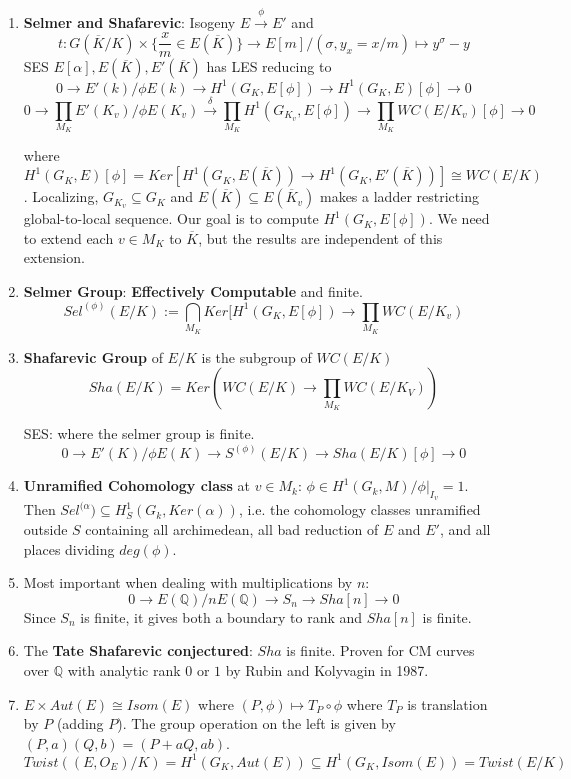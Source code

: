 \documentclass{article}
\newcommand{\Q}{\mathbb{Q}}
\newcommand{\ra}{\rightarrow}
\newcommand{\raa}[1]{\overset{#1}{\longrightarrow}}
\newcommand{\ACK}{\overline{K}}
\begin{document}
\begin{multicols}{2}
\begin{enumerate}
\item \textbf{Selmer and Shafarevic}: Isogeny $E \raa{\phi} E'$ and 
\[t: G(\ACK/K) \times \{\frac{x}{m} \in E(\ACK)\} \ra E[m]/(\sigma,y_x = x/m) \mapsto y^\sigma - y\]
SES $E[\alpha], E(\ACK), E'(\ACK)$ has LES reducing to 
\[0 \ra E'(k)/\phi E(k) \ra H^1(G_K, E[\phi]) \ra H^1(G_K,E)[\phi] \ra 0\]
\[0 \ra \prod_{M_K} E'(K_v)/\phi E(K_v) \raa{\delta} \prod_{M_K} H^1(G_{K_v}, E[\phi]) \ra \prod_{M_K} WC(E/K_v)[\phi] \ra 0\]

where $H^1(G_K,E)[\phi] = Ker[H^1(G_K,E(\ACK)) \ra H^1(G_K,E'(\ACK))] \cong WC(E/K)$. Localizing, $G_{K_v} \subseteq G_K$ and $E(\ACK) \subseteq E(\ACK_v)$ makes a ladder restricting global-to-local sequence. Our goal is to compute $H^1(G_K,E[\phi])$. We need to extend each $v \in M_K$ to $\ACK$, but the results are independent of this extension. 

\item \textbf{Selmer Group}: \textbf{Effectively Computable} and finite. \[Sel^{(\phi)}(E/K) :=\bigcap_{M_K} Ker[H^1(G_K,E[\phi]) \ra \prod_{M_K} WC(E/K_v)\]

\item \textbf{Shafarevic Group} of $E/K$ is the subgroup of $WC(E/K)$
\[Sha(E/K) = Ker(WC(E/K) \ra \prod_{M_K}WC(E/K_V))\]

SES: where the selmer group is finite. 
\[0 \ra E'(K)/\phi E(K) \ra S^{(\phi)}(E/K) \ra Sha(E/K)[\phi] \ra 0\]

\item \textbf{Unramified Cohomology class} at $v \in M_k$: $\phi \in H^1(G_k,M)/ \phi|_{I_v} = 1$. Then $Sel^{(\alpha}) \subseteq H_S^1(G_k,Ker(\alpha))$, i.e. the cohomology classes unramified outside $S$ containing all archimedean, all bad reduction of $E$ and $E'$, and all places dividing $deg(\phi)$.  

 
\item Most important when dealing with multiplications by $n$:
\[0 \ra E(\Q)/nE(\Q) \ra S_n \ra Sha[n] \ra 0\]
Since $S_n$ is finite, it gives both a boundary to rank and $Sha[n]$ is finite.
\item The \textbf{Tate Shafarevic conjectured}: $Sha$ is finite. Proven for CM curves over $\Q$ with analytic rank $0$ or $1$ by Rubin and Kolyvagin in 1987.

\item $E \times Aut(E) \cong Isom(E)$ where $(P,\phi) \mapsto T_P \circ \phi$ where $T_P$ is translation by $P$ (adding $P$). The group operation on the left is given by $(P,a)(Q,b) = (P+aQ, ab)$.  
\[Twist((E,O_E)/K) = H^1(G_K,Aut(E)) \subseteq H^1(G_K,Isom(E)) = Twist(E/K)\]


\end{enumerate}
\end{multicols}
\end{document}
